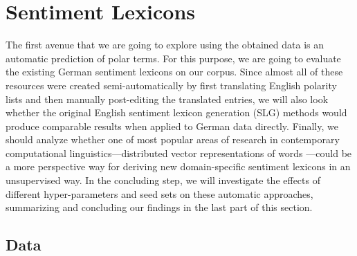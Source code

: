 

\chapter{Sentiment Lexicons}\label{sec:snt:lex}

The first avenue that we are going to explore using the obtained data
is an automatic prediction of polar terms.
For this purpose, we are going to evaluate the existing German
sentiment lexicons on our corpus.  Since almost all of these resources
were created semi-automatically by first translating English polarity
lists and then manually post-editing the translated entries, we will
also look whether the original English sentiment lexicon generation
(SLG) methods would produce comparable results when applied to German
data directly.  Finally, we should analyze whether one of most popular
areas of research in contemporary computational
linguistics---distributed vector representations of words
\cite{Mikolov:13}---could be a more perspective way for deriving new
domain-specific sentiment lexicons in an unsupervised way.  In the
concluding step, we will investigate the effects of different
hyper-parameters and seed sets on these automatic approaches,
summarizing and concluding our findings in the last part of this
section.

\section{Data}\label{subsec:snt-lex:data}

